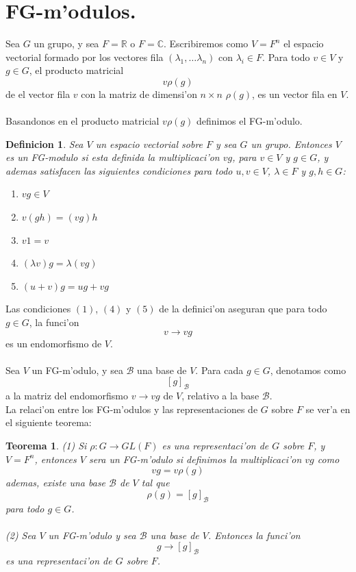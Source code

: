 \documentclass[a4paper,openright,12pt]{book}
\numberwithin{equation}{section} %
\newtheorem{teorema}{Teorema}[section] %
\newtheorem{definicion}{Definicion}[section] %
\begin{document}
\section{FG-m'odulos.}
Sea $G$ un grupo, y sea $F=\mathbb{R}$ o $F=\mathbb{C}$. Escribiremos como $V=F^{n}$ el espacio vectorial formado por los vectores fila $(\lambda_{1}, \ldots \lambda_{n})$ con $\lambda_{i} \in F$. Para todo $v \in V$ y $g \in G$, el producto matricial 
\[
v\rho (g)
\]
de el vector fila $v$ con la matriz de dimensi'on $n \times n$ $\rho (g)$, es un vector fila en $V$.\\
\\
Basandonos en el producto matricial $v\rho (g)$ definimos el FG-m'odulo.
\begin{definicion}
Sea $V$ un espacio vectorial sobre $F$ y sea $G$ un grupo. Entonces $V$ es un FG-modulo si esta definida la multiplicaci'on $vg$, para $v \in V$ y $g \in G$, y ademas satisfacen las siguientes condiciones para todo $u, v \in V$, $\lambda \in F$ y $g ,h \in G$:
\begin{enumerate}
\item $vg \in V$
\item $v(gh)=(vg)h$
\item $v1=v$
\item $(\lambda v)g=\lambda (vg)$
\item $(u+v)g=ug+vg$
\end{enumerate}
\end{definicion}
Las condiciones $(1)$, $(4)$ y $(5)$ de la definici'on aseguran que para todo $g \in G$, la funci'on
\[
v \rightarrow vg
\]
es un endomorfismo de $V$.\\
\\
Sea $V$ un FG-m'odulo, y sea $\mathscr{B}$ una base de $V$. Para cada $g \in G$, denotamos como 
\[
[g]_{\mathscr{B}}
\]
a la matriz del endomorfismo $v \rightarrow vg$ de $V$, relativo a la base $\mathscr{B}$.\\
La relaci'on entre los FG-m'odulos y las representaciones de $G$ sobre $F$ se ver'a en el siguiente teorema:
\begin{teorema}
(1) Si $\rho : G \rightarrow GL(F)$ es una representaci'on de $G$ sobre $F$, y $V=F^{n}$, entonces $V$ sera un FG-m'odulo si definimos la multiplicaci'on $vg$ como
\[
vg=v \rho (g)
\]
ademas, existe una base $\mathscr{B}$ de $V$ tal que
\[
\rho (g) = [g]_{\mathscr{B}}
\]
para todo $g \in G$.\\
\\
(2) Sea $V$ un FG-m'odulo y sea $\mathscr{B}$ una base de $V$. Entonces la funci'on 
\[
g \rightarrow [g]_{\mathscr{B}}
\]
es una representaci'on de $G$ sobre $F$. 
\end{teorema}
\end{document}
